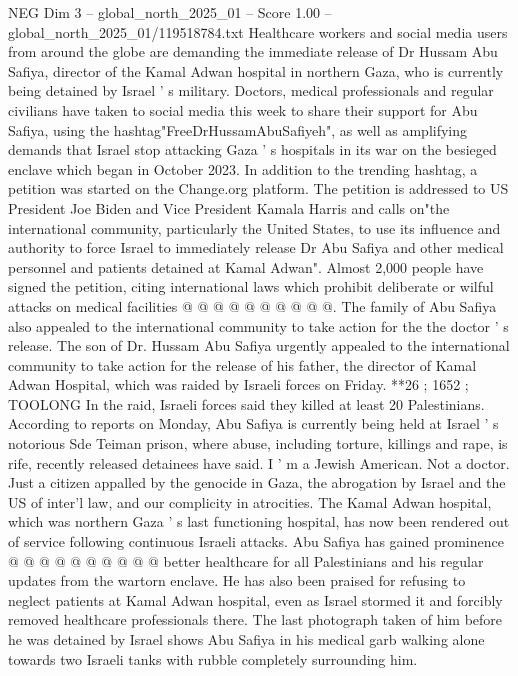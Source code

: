\begin{textsample}{NEG Dim 3 – global\_north\_2025\_01 – Score 1.00 – global\_north\_2025\_01/119518784.txt}  \label{ex:f3_neg_217}
Healthcare workers and social media users from around the globe are demanding the immediate release of Dr Hussam Abu Safiya, director of the Kamal Adwan hospital in northern Gaza, who is currently being detained by Israel ' s military.
Doctors, medical professionals and regular civilians have taken to social media this week to share their support for Abu Safiya, using the hashtag"FreeDrHussamAbuSafiyeh", as well as amplifying demands that Israel stop attacking Gaza ' s hospitals in its war on the besieged enclave which began in October 2023.
In addition to the trending hashtag, a petition was started on the Change.org platform.
The petition is addressed to US President Joe Biden and Vice President Kamala Harris and calls on"the international community, particularly the United States, to use its influence and authority to force Israel to immediately release Dr Abu Safiya and other medical personnel and patients detained at Kamal Adwan".
Almost 2,000 people have signed the petition, citing international laws which prohibit deliberate or wilful attacks on medical facilities @ @ @ @ @ @ @ @ @ @.
The family of Abu Safiya also appealed to the international community to take action for the the doctor ' s release.
The son of Dr.
Hussam Abu Safiya urgently appealed to the international community to take action for the release of his father, the director of Kamal Adwan Hospital, which was raided by Israeli forces on Friday. **26 ; 1652 ; TOOLONG In the raid, Israeli forces said they killed at least 20 Palestinians.
According to reports on Monday, Abu Safiya is currently being held at Israel ' s notorious Sde Teiman prison, where abuse, including torture, killings and rape, is rife, recently released detainees have said.
I ' m a Jewish American.
Not a doctor.
Just a citizen appalled by the genocide in Gaza, the abrogation by Israel and the US of inter'l law, and our complicity in atrocities.
The Kamal Adwan hospital, which was northern Gaza ' s last functioning hospital, has now been rendered out of service following continuous Israeli attacks.
Abu Safiya has gained prominence @ @ @ @ @ @ @ @ @ @ better healthcare for all Palestinians and his regular updates from the wartorn enclave.
He has also been praised for refusing to neglect patients at Kamal Adwan hospital, even as Israel stormed it and forcibly removed healthcare professionals there.
The last photograph taken of him before he was detained by Israel shows Abu Safiya in his medical garb walking alone towards two Israeli tanks with rubble completely surrounding him.

\end{textsample}
